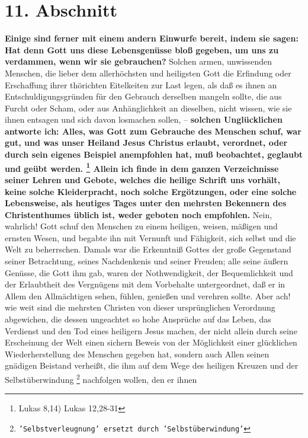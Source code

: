 {\section{11. Abschnitt} \label{kap17_ab11}

\textbf{Einige sind ferner mit einem andern Einwurfe bereit, indem sie sagen:
Hat denn
Gott uns diese Lebensgenüsse bloß gegeben, um uns zu verdammen, wenn wir sie
gebrauchen?} Solchen armen, unwissenden Menschen, die lieber dem allerhöchsten
und heiligsten Gott die Erfindung oder Erschaffung ihrer thörichten Eitelkeiten
zur Last legen, als daß es ihnen an Entschuldigungsgründen für den Gebrauch
derselben mangeln sollte, die aus Furcht oder Scham, oder aus Anhänglichkeit an
dieselben, nicht wissen, wie sie ihnen entsagen und sich davon losmachen sollen,
-- \textbf{solchen Unglücklichen antworte ich: Alles, was Gott zum Gebrauche des
Menschen schuf, war gut, und was unser Heiland Jesus Christus erlaubt,
verordnet, oder durch sein eigenes Beispiel anempfohlen hat, muß beobachtet,
geglaubt und geübt werden. 
\footnote{Lukas  8,14) Lukas 12,28-31}
Allein ich
finde in dem ganzen Verzeichnisse seiner Lehren und Gebote, welches die heilige
Schrift uns vorhält, keine solche Kleiderpracht, noch solche Ergötzungen, oder
eine solche Lebensweise, als heutiges Tages unter den mehrsten Bekennern des
Christenthumes üblich ist, weder geboten noch empfohlen.} Nein, wahrlich! Gott
schuf den Menschen zu einem heiligen, weisen, mäßigen und ernsten Wesen, und
begabte ihn mit Vernunft und Fähigkeit, sich selbst und die Welt zu beherrschen.
Damals war die Erkenntniß Gottes der große Gegenstand seiner Betrachtung, seines
Nachdenkenis und seiner Freuden; alle seine äußern Genüsse, die Gott ihm gab,
waren der Nothwendigkeit, der Bequemlichkeit und der Erlaubtheit des Vergnügens
mit dem Vorbehalte untergeordnet, daß er in Allem den Allmächtigen sehen,
fühlen, genießen und verehren sollte. Aber ach! wie weit sind die mehrsten
Christen von dieser ursprünglichen Verordnung abgewichen, die dessen ungeachtet
so hohe Ansprüche auf das Leben, das Verdienst und den Tod eines heiligern Jesus
machen, der nicht allein durch seine Erscheinung der Welt einen sichern Beweis
von der Möglichkeit einer glücklichen Wiederherstellung des Menschen gegeben
hat, sondern auch Allen seinen gnädigen Beistand verheißt, die ihm auf dem Wege
des heiligen Kreuzen und der Selbstüberwindung
\footnote{\texttt{'Selbstverleugnung' ersetzt durch 'Selbstüberwindung'}}
nachfolgen wollen, den er ihnen
}

